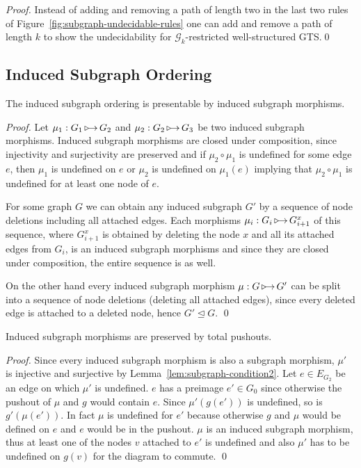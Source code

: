 \documentclass{llncs}
\newcommand{\indsubArrow}{\mathop{\textnormal{\texttt{$\triangleright$}}\;\!\!\!\!\to}}
\newcommand{\indsubOrder}{\unlhd}
\begin{document}
{\begin{proof}
Instead of adding and removing a path of length two in the last two rules of 
Figure~\ref{fig:subgraph-undecidable-rules} one can add and remove a path of 
length $k$ to show the undecidability for $\mathcal{G}_k$-restricted 
well-structured GTS.\qed
\end{proof}

\subsection{Induced Subgraph Ordering}



\begin{lemma}\label{lem:indsubgraph-condition1}
The induced subgraph ordering is presentable by induced subgraph
morphisms.
\end{lemma}

\begin{proof}
Let $\mu_1 : G_1 \indsubArrow G_2$ and $\mu_2 : G_2 \indsubArrow G_3$ be two 
induced subgraph morphisms. Induced subgraph morphisms are closed under 
composition, since injectivity and surjectivity are preserved and if $\mu_2 
\circ \mu_1$ is undefined for some edge $e$, then $\mu_1$ is undefined on $e$ 
or $\mu_2$ is undefined on $\mu_1(e)$ implying that $\mu_2 \circ \mu_1$ is 
undefined for at least one node of $e$.

For some graph $G$ we can obtain any induced subgraph $G'$ by a sequence of 
node deletions including all attached edges. Each morphisms  
$\mu_i : G_i \indsubArrow G_{i+1}^x$ of this sequence, where $G_{i+1}^x$ is 
obtained by deleting the node $x$ and all its attached edges from $G_i$, is an 
induced subgraph morphisms and since they are closed under composition, the 
entire sequence is as well.

On the other hand every induced subgraph morphism $\mu : G \indsubArrow G'$ 
can be split into a sequence of node deletions (deleting all attached edges), 
since every deleted edge is attached to a deleted node, hence $G' \indsubOrder 
G$. \qed
\end{proof}

\begin{lemma}\label{lem:indsubgraph-condition2}
Induced subgraph morphisms are preserved by total pushouts.
\end{lemma}

\begin{proof}
  Since every induced subgraph morphism is also a subgraph morphism,
  $\mu'$ is injective and surjective by
  Lemma~\ref{lem:subgraph-condition2}.  Let $e \in E_{G_2}$ be an edge
  on which $\mu'$ is undefined. $e$ has a preimage $e' \in G_0$ since
  otherwise the pushout of $\mu$ and $g$ would contain $e$.  Since
  $\mu'(g(e'))$ is undefined, so is $g'(\mu(e'))$. In fact $\mu$ is
  undefined for $e'$ because otherwise $g$ and $\mu$ would be defined
  on $e$ and $e$ would be in the pushout. $\mu$ is an induced subgraph
  morphism, thus at least one of the nodes $v$ attached to $e'$ is
  undefined and also $\mu'$ has to be undefined on $g(v)$ for the
  diagram to commute. \qed
\end{proof}

}
\end{document}
